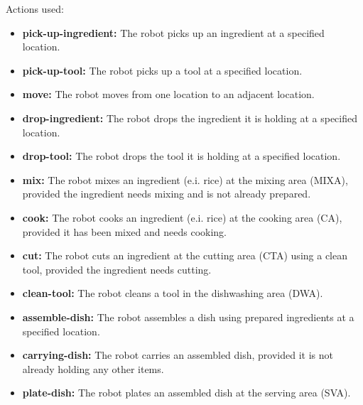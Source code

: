 Actions used:
\begin{itemize}
    \item \textbf{pick-up-ingredient:} The robot picks up an ingredient at a specified location.
    \item \textbf{pick-up-tool:} The robot picks up a tool at a specified location.
    \item \textbf{move:} The robot moves from one location to an adjacent location.
    \item \textbf{drop-ingredient:} The robot drops the ingredient it is holding at a specified location.
    \item \textbf{drop-tool:} The robot drops the tool it is holding at a specified location.
    \item \textbf{mix:} The robot mixes an ingredient (e.i. rice) at the mixing area (MIXA), provided the ingredient needs mixing and is not already prepared.
    \item \textbf{cook:} The robot cooks an ingredient (e.i. rice) at the cooking area (CA), provided it has been mixed and needs cooking.
    \item \textbf{cut:} The robot cuts an ingredient at the cutting area (CTA) using a clean tool, provided the ingredient needs cutting.
    \item \textbf{clean-tool:} The robot cleans a tool in the dishwashing area (DWA).
    \item \textbf{assemble-dish:} The robot assembles a dish using prepared ingredients at a specified location.
    \item \textbf{carrying-dish:} The robot carries an assembled dish, provided it is not already holding any other items.
    \item \textbf{plate-dish:} The robot plates an assembled dish at the serving area (SVA).
\end{itemize}

